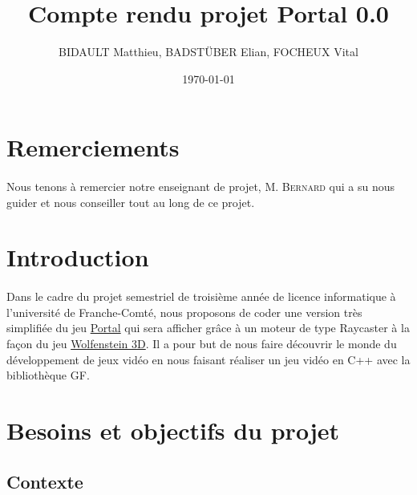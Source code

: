 \documentclass[12pt]{report}
\title{Compte rendu projet Portal 0.0}
\author{BIDAULT Matthieu, BADSTÜBER Elian, FOCHEUX Vital}
\date{\today}
\begin{document}
\maketitle

\section*{Remerciements}

\paragraph{}
Nous tenons à remercier notre enseignant de projet, M. \textsc{Bernard} 
qui a su nous guider et nous conseiller tout au long de ce projet.


\tableofcontents

\section{Introduction}

\paragraph{}

Dans le cadre du projet semestriel de troisième année de licence
informatique à l'université de Franche-Comté, nous proposons de coder
une version très simplifiée du jeu \href{https://fr.wikipedia.org/wiki/Portal_(jeu_vid%C3%A9o)}{Portal}
qui sera afficher grâce à un moteur de type Raycaster à la façon du jeu
\href{https://fr.wikipedia.org/wiki/Wolfenstein_3D}{Wolfenstein 3D}.
Il a pour but de nous faire découvrir le monde du développement de jeux 
vidéo en nous faisant réaliser un jeu vidéo en C++ avec la bibliothèque 
GF.

\clearpage

\section{Besoins et objectifs du projet}
\subsection{Contexte}
\end{document}
